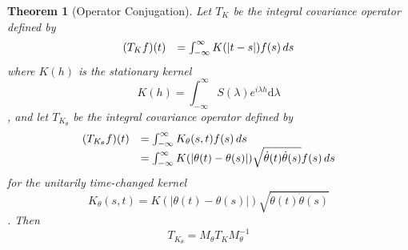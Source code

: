 \documentclass{article}
\newcommand{\mathd}{\mathrm{d}}
\newtheorem{theorem}{Theorem}
\begin{document}
\begin{theorem}
[Operator Conjugation]\label{thm:operator_conjugation} Let $T_K$ be the
integral covariance operator defined by
\begin{equation}
\label{eq:integral_op_original} \begin{array}{ll}
(T_K f) (t) & = \int_{- \infty}^{\infty} K (|t - s|) f (s)
\hspace{0.17em} ds
\end{array}
\end{equation}
where $K (h)$ is the stationary kernel
\begin{equation}
K (h) = \int_{- \infty}^{\infty} S (\lambda) e^{i \lambda h} \mathd
\lambda
\end{equation}
, and let $T_{K_{\theta}}$ be the integral covariance operator defined by
\begin{equation}
\label{eq:integral_op_transformed} \begin{array}{ll}
(T_{K_{\theta}} f) (t) & = \int_{- \infty}^{\infty} K_{\theta} (s, t) f
(s) \hspace{0.17em} ds\\
& = \int_{- \infty}^{\infty} K (| \theta (t) - \theta (s) |)
\sqrt{\dot{\theta} (t) \dot{\theta} (s)} f (s) \hspace{0.17em} ds
\end{array}
\end{equation}
for the unitarily time-changed kernel
\begin{equation}
K_{\theta} (s, t) = K (| \theta (t) - \theta (s) |) \sqrt{\dot{\theta} (t)
\dot{\theta} (s)}
\end{equation}
. Then
\begin{equation}
\label{eq:conjugation} T_{K_{\theta}} = M_{\theta} T_K M_{\theta}^{- 1}
\end{equation}
\end{theorem}
\end{document}
